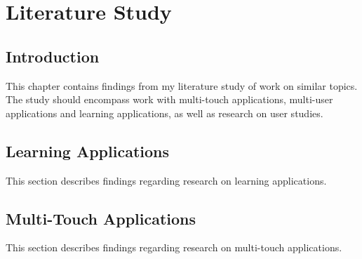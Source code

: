 
\chapter{Literature Study} %

\label{Chapter2} %



\section{Introduction}

This chapter contains findings from my literature study of work on similar topics. The study should encompass work with multi-touch applications, multi-user applications and learning applications, as well as research on user studies.


\section{Learning Applications}

This section describes findings regarding research on learning applications.


\section{Multi-Touch Applications}

This section describes findings regarding research on multi-touch applications.


